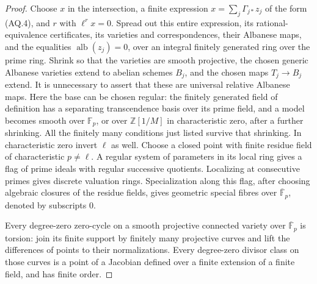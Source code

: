 \documentclass[11pt,a4paper]{article}
\theoremstyle{definition}\newtheorem{definition}[theorem]{Definition}
\theoremstyle{remark}\newtheorem{remark}[theorem]{Remark}
\begin{document}
\begin{proof}
Choose $x$ in the intersection, a finite expression
$x=\sum_j\Gamma_{j*}z_j$ of the form (AQ.4), and $r$ with
$\ell^r x=0$. Spread out this entire expression, its
rational-equivalence certificates, its varieties and
correspondences, their Albanese maps, and the equalities
$\operatorname{alb}(z_j)=0$, over an integral finitely generated
ring over the prime ring. Shrink so that the varieties are
smooth projective, the chosen generic Albanese varieties extend
to abelian schemes $B_j$, and the chosen maps $T_j\to B_j$
extend. It is unnecessary to assert that these are universal
relative Albanese maps. Here the base can be chosen regular:
the finitely generated field of definition has a separating
transcendence basis over its prime field, and a model becomes
smooth over $\mathbb F_p$, or over $\mathbb Z[1/M]$ in
characteristic zero, after a further shrinking. All the
finitely many conditions just listed survive that shrinking.
In characteristic zero invert $\ell$ as well.
Choose a closed point with finite residue field of
characteristic $p\ne\ell$. A regular system of parameters
in its local ring gives a flag of prime ideals with regular
successive quotients. Localizing at consecutive primes
gives discrete valuation rings. Specialization along this
flag, after choosing algebraic closures of the residue
fields, gives geometric special fibres over
$\overline{\mathbb F}_p$, denoted by subscripts $0$.

Every degree-zero zero-cycle on a smooth projective connected
variety over $\overline{\mathbb F}_p$ is torsion: join its
finite support by finitely many projective curves and lift
the differences of points to their normalizations. Every
degree-zero divisor class on those curves is a point of a
Jacobian defined over a finite extension of a finite field,
and has finite order.


\end{proof}
\end{document}
